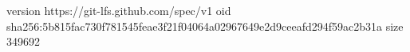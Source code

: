 version https://git-lfs.github.com/spec/v1
oid sha256:5b815fac730f781545feae3f21f04064a02967649e2d9ceeafd294f59ac2b31a
size 349692
